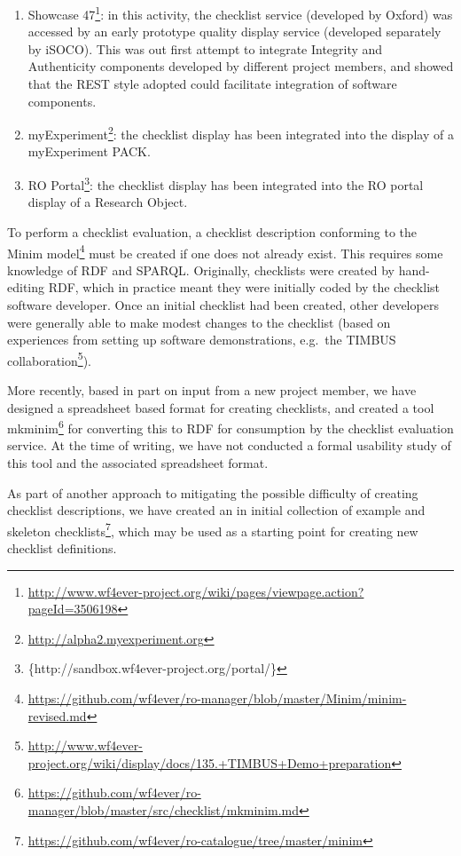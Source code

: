\begin{enumerate}
\def\labelenumi{\arabic{enumi}.}
\itemsep1pt\parskip0pt
\item
  Showcase 47\footnote{\url{http://www.wf4ever-project.org/wiki/pages/viewpage.action?pageId=3506198}}:
  in this activity, the checklist service (developed by Oxford) was
  accessed by an early prototype quality display service (developed
  separately by iSOCO). This was out first attempt to integrate
  Integrity and Authenticity components developed by different project
  members, and showed that the REST style adopted could facilitate
  integration of software components.
\item
  myExperiment\footnote{\url{http://alpha2.myexperiment.org}}: the
  checklist display has been integrated into the display of a
  myExperiment PACK.
\item
  RO Portal\footnote{\{http://sandbox.wf4ever-project.org/portal/\}}:
  the checklist display has been integrated into the RO portal display
  of a Research Object.
\end{enumerate}

To perform a checklist evaluation, a checklist description conforming to
the Minim model\footnote{\url{https://github.com/wf4ever/ro-manager/blob/master/Minim/minim-revised.md}}
must be created if one does not already exist. This requires some
knowledge of RDF and SPARQL. Originally, checklists were created by
hand-editing RDF, which in practice meant they were initially coded by
the checklist software developer. Once an initial checklist had been
created, other developers were generally able to make modest changes to
the checklist (based on experiences from setting up software
demonstrations, e.g.~the TIMBUS collaboration\footnote{\url{http://www.wf4ever-project.org/wiki/display/docs/135.+TIMBUS+Demo+preparation}}).

More recently, based in part on input from a new project member, we have
designed a spreadsheet based format for creating checklists, and created
a tool mkminim\footnote{\url{https://github.com/wf4ever/ro-manager/blob/master/src/checklist/mkminim.md}}
for converting this to RDF for consumption by the checklist evaluation
service. At the time of writing, we have not conducted a formal
usability study of this tool and the associated spreadsheet format.

As part of another approach to mitigating the possible difficulty of
creating checklist descriptions, we have created an in initial
collection of example and skeleton checklists\footnote{\url{https://github.com/wf4ever/ro-catalogue/tree/master/minim}},
which may be used as a starting point for creating new checklist
definitions.

